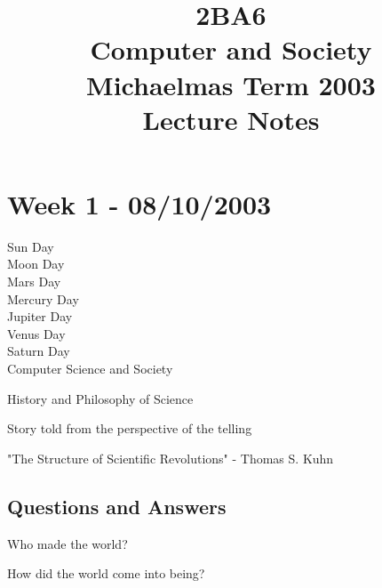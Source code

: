 \documentclass[a4paper,12pt]{article}
\begin{document}
\title{2BA6 \\ Computer and Society \\ Michaelmas Term 2003 \\ Lecture
Notes}

\author{}%

\date{}

\maketitle

\section*{Week 1 - 08/10/2003}

 Sun Day \\
 Moon Day \\
 Mars Day\\
 Mercury Day\\
 Jupiter Day\\
 Venus Day\\
 Saturn Day\\


\noindent Computer Science and Society

\vspace{10mm}

\noindent History and Philosophy of Science

\vspace{10mm}

\noindent Story told from the perspective of the telling

\vspace{10mm}

\noindent "The Structure of Scientific Revolutions" - Thomas S. Kuhn

\vspace{10mm}

\subsection*{Questions and Answers}

\noindent Who made the world?

\vspace{10mm}

\noindent How did the world  come into being?

\vspace{10mm}
\end{document}
